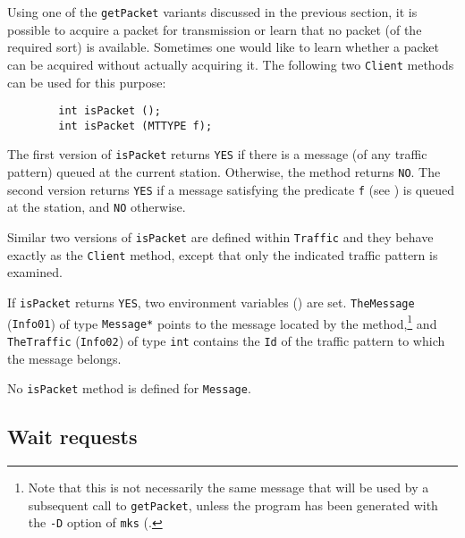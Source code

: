 Using one of the {\tt getPacket} variants discussed in the previous section,
it is possible to acquire a packet for transmission or learn that no
packet (of the required sort) is available.
Sometimes one would like to learn whether a packet can be acquired without
actually acquiring it.
The following two {\tt Client} methods can be used for this
purpose:
\begin{verbatim}
        int isPacket ();
        int isPacket (MTTYPE f);
\end{verbatim}
The first version of {\tt isPacket} returns {\tt YES} if there is a message
(of any traffic pattern)
queued at the current station.
Otherwise, the method returns {\tt NO}.
The second version returns {\tt YES} if a message
satisfying the predicate {\tt f} (see ) is queued at the
station, and {\tt NO} otherwise.

Similar two versions of {\tt isPacket} are defined within {\tt Traffic} and
they behave exactly as the {\tt Client} method, except that only the
indicated traffic pattern is examined.

If {\tt isPacket} returns {\tt YES}, two environment variables
()
are set.
{\tt TheMessage} ({\tt Info01}) of type {\tt Message*} points to the
message located by the method,\footnote{Note that this is not necessarily
the same message that will be used by a subsequent call to {\tt getPacket},
unless the program has been generated with the {\tt -D} option of {\tt mks}
(.}
and {\tt TheTraffic} ({\tt Info02}) of type
{\tt int} contains the {\tt Id} of the traffic pattern to which the message
belongs.

No {\tt isPacket} method is defined for {\tt Message}.

\subsection{Wait requests}
\label{rm_cl_wr}

